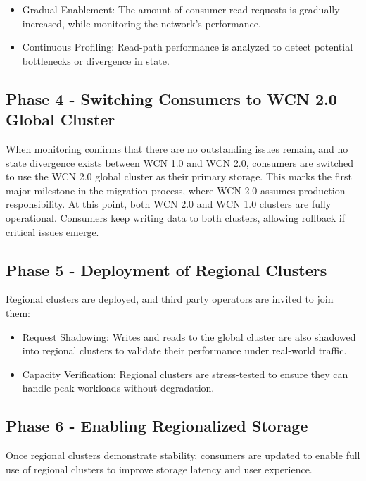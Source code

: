 \documentclass[10pt,twocolumn]{article}
\begin{document}
\begin{itemize}
    \item Gradual Enablement: The amount of consumer read requests is gradually increased, while monitoring the network's performance.
    \item Continuous Profiling: Read-path performance is analyzed to detect potential bottlenecks or divergence in state.
\end{itemize}

\subsection*{Phase 4 - Switching Consumers to WCN 2.0 Global Cluster}

When monitoring confirms that there are no outstanding issues remain, and no state divergence exists between WCN 1.0 and WCN 2.0, consumers are switched to use the WCN 2.0 global cluster as their primary storage. This marks the first major milestone in the migration process, where WCN 2.0 assumes production responsibility. At this point, both WCN 2.0 and WCN 1.0 clusters are fully operational. Consumers keep writing data to both clusters, allowing rollback if critical issues emerge.

\subsection*{Phase 5 - Deployment of Regional Clusters}

Regional clusters are deployed, and third party operators are invited to join them:

\begin{itemize}
    \item Request Shadowing: Writes and reads to the global cluster are also shadowed into regional clusters to validate their performance under real-world traffic.
    \item Capacity Verification: Regional clusters are stress-tested to ensure they can handle peak workloads without degradation.
\end{itemize}

\subsection*{Phase 6 - Enabling Regionalized Storage}

Once regional clusters demonstrate stability, consumers are updated to enable full use of regional clusters to improve storage latency and user experience.
\end{document}
